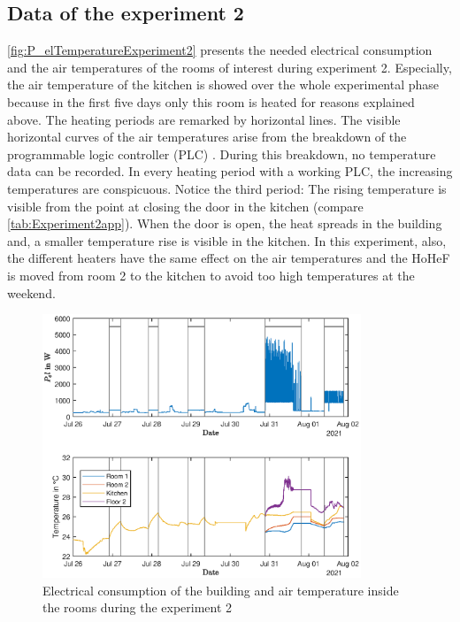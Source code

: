 \subsection{Data of the experiment 2}
\label{subsec:Data of the experiment 2}
\autoref{fig:P_elTemperatureExperiment2} presents the needed electrical consumption and the air temperatures of the rooms of interest during experiment 2. Especially, the air temperature of the kitchen is showed over the whole experimental phase because in the first five days only this room is heated for reasons explained above. The heating periods are remarked by horizontal lines. The visible horizontal curves of the air temperatures arise from the breakdown of the programmable logic controller (PLC) . During this breakdown, no temperature data can be recorded. In every heating period with a working PLC, the increasing temperatures are conspicuous. Notice the third period: The rising temperature is visible from the point at closing the door in the kitchen (compare \autoref{tab:Experiment2app}). When the door is open, the heat spreads in the building and, a smaller temperature rise is visible in the kitchen.  In this experiment, also, the different heaters have the same effect on the air temperatures and the HoHeF is moved from room 2 to the kitchen to avoid too high temperatures at the weekend.
\begin{figure}[H]
            \centering
            \includegraphics[width=0.85\textwidth]{figure/Trainingsdaten_P_el_und_Raumtemperaturen_latex.eps}
           \caption{Electrical consumption of the building and air temperature inside the rooms during the experiment 2}
           \label{fig:P_elTemperatureExperiment2}
\end{figure}

